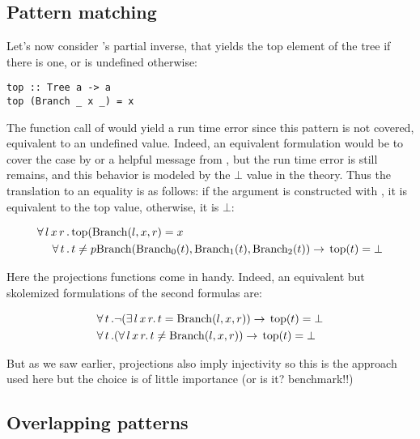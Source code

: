 \subsection{Pattern matching}

Let's now consider 's partial inverse,  that
yields the top element of the tree if there is one, or is undefined
otherwise:

\begin{verbatim}
top :: Tree a -> a
top (Branch _ x _) = x
\end{verbatim}

The function call of  would yield a run time error
since this pattern is not covered, equivalent to an undefined
value. Indeed, an equivalent formulation would be to cover the
 case by  or a helpful message from
, but the run time error is still remains, and this
behavior is modeled by the $\bot$ value in the theory. Thus the
translation to an equality is as follows: if the argument is
constructed with , it is equivalent to the top value,
otherwise, it is $\bot$:

\begin{align*}
 \forall \, l \, x \, r \, & . \, \mathrm{top}(\mathrm{Branch}(l,x,r) = x\\
 \forall \, t \, & . \, t \neq
p \mathrm{Branch}(\mathrm{Branch_{0}}(t),\mathrm{Branch_{1}}(t),\mathrm{Branch_{2}}(t))
 \rightarrow \, \mathrm{top}(t)  = \mathrm{\bot}\\
\end{align*}

Here the projections functions come in handy. Indeed, an equivalent
but skolemized formulations of the second formulas are:

\begin{align*}
 \forall \, t \, & . \neg (\exists \, l \, x \, r . \, t =
 \mathrm{Branch}(l,x,r))
 \rightarrow \, \mathrm{top}(t) = \bot \\
 \forall \, t \, & . (\forall \, l \, x \, r . \, t \neq
 \mathrm{Branch}(l,x,r))
 \rightarrow \, \mathrm{top}(t) = \bot \\
\end{align*}

But as we saw earlier, projections also imply injectivity so this is
the approach used here but the choice is of little importance (or is
it? benchmark!!)

\subsection{Overlapping patterns}

